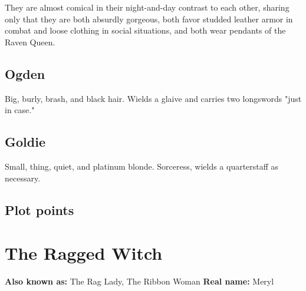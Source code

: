 \documentclass{report}
\newif\ifdm
\newcommand{\dmonly}[1]{\ifdm{\color{blue}\textit{[DM Only:]} #1}\else{}\fi}
\newcommand{\headeritem}[2]{\newline\textbf{#1:} #2}
\begin{document}
  They are almost comical in their night-and-day contrast to each other, sharing only that they are
   both absurdly gorgeous, both favor studded leather armor in combat and loose clothing in social
   situations, and both wear pendants of the Raven Queen.

  \subsection{Ogden}\label{subsec:ogden}
  Big, burly, brash, and black hair.
  Wields a glaive and carries two longswords "just in case."
  \dmonly{Pack of the Blade: the glaive.}
  \dmonly{Use Gladiator stat block plus minor spellcasting, set CHA to 18, CR 5+}

  \subsection{Goldie}\label{subsec:goldie}
  Small, thing, quiet, and platinum blonde.
  Sorceress, wields a quarterstaff as necessary.
  \dmonly{Pack of the Tome: grants Fire Bolt, Dancing Lights, Ray of Frost}
  \dmonly{Use Mage stat block, swap in some Warlock spells,
    consider Studded Leather Armor, set Cha 18, CR 6+}
  \subsection{Plot points}\label{subsec:plotPoints}
  \dmonly{
    Ogden and Goldie are both in truth warlocks of the Hexblade.
    After the Act I arc, The Group will be invited to a high society gala to celebrate
     their successes.
    Goldie will distract the court magus with conversation and a low-cut dress.
    Ogden will speak with one or more members of The Group.
    After a lull, Ogden will sigh and excuse himself with the following.

    ``[sigh] Well, I should probably get to it then.
      I've enjoyed our conversations over the past weeks.
      No, I mean it.
      I'll remember you fondly, no matter what.
      [pause]
      I hope you do the same.''

    He walks towards Goldie, who looks up.
    He nods at her.
    Simultaneously, she summons her warpick and he his glaive.
    She caves in the skull of the magus while Ogden sheers the head off of Plot Target.
    Both flee immediately, mist
  }


  \section{The Ragged Witch}\label{sec:theRaggedWitch}
  \headeritem{Also known as}{The Rag Lady, The Ribbon Woman}
  \headeritem{Real name}{Meryl}
\end{document}

